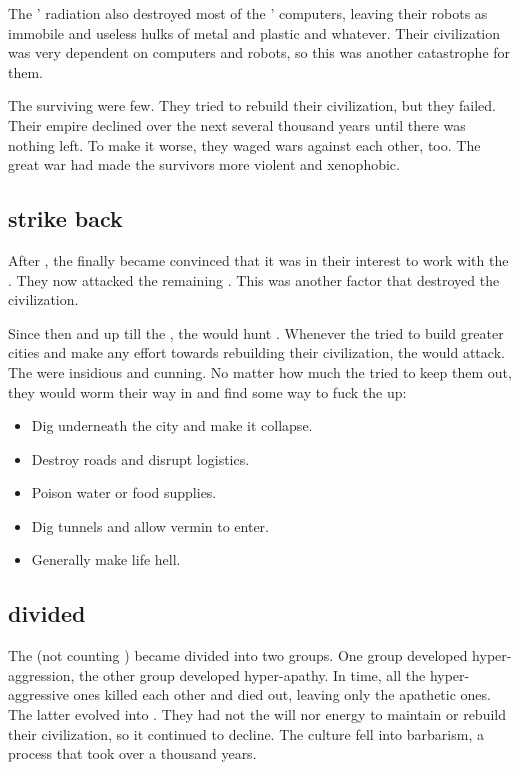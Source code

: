 The \banes' radiation also destroyed most of the \ophidians' computers, leaving their robots as immobile and useless hulks of metal and plastic and whatever.
Their civilization was very dependent on computers and robots, so this was another catastrophe for them.

The surviving \ophidians were few. 
They tried to rebuild their civilization, but they failed. 
Their empire declined over the next several thousand years until there was nothing left. 
To make it worse, they waged wars against each other, too. 
The great war had made the survivors more violent and xenophobic. 





\subsection{\Noggyaleth strike back}
After , the \noggyaleth finally became convinced that it was in their interest to work with the \banes. 
They now attacked the remaining \ophidians. 
This was another factor that destroyed the \ophidian civilization. 

Since then and up till the \thirdbanewar, the \noggyaleth would hunt \ophidians.
Whenever the \ophidians tried to build greater cities and make any effort towards rebuilding their civilization, the \noggyaleth would attack. 
The \noggyaleth were insidious and cunning.
No matter how much the \ophidians tried to keep them out, they would worm their way in and find some way to fuck the \ophidians up:
\begin{itemize}
  \item Dig underneath the city and make it collapse.
  \item Destroy roads and disrupt logistics. 
  \item Poison water or food supplies.
  \item Dig tunnels and allow vermin to enter. 
  \item Generally make life hell. 
\end{itemize}








\subsection{\Ophidians divided}
The \ophidians{} (not counting \dragons) became divided into two groups. 
One group developed hyper-aggression, the other group developed hyper-apathy. 
In time, all the hyper-aggressive ones killed each other and died out, leaving only the apathetic ones. 
The latter evolved into \quiljaaran. 
They had not the will nor energy to maintain or rebuild their civilization, so it continued to decline. 
The \ophidian{} culture fell into barbarism, a process that took over a thousand years. 


